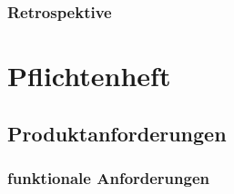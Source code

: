 \documentclass[a4paper, 11pt]{scrreprt}
\begin{document}
\subsection{Retrospektive}

\chapter{Pflichtenheft}

\section{Produktanforderungen}

\subsection{funktionale Anforderungen}
\end{document}
